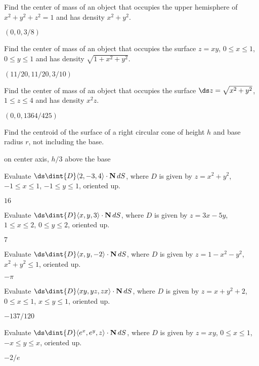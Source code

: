 \begin{exercises}

\exercise Find the center of mass of an object that occupies the upper
hemisphere of $x^2+y^2+z^2=1$ and has density $x^2+y^2$.
\begin{answer} $(0,0,3/8)$
\end{answer}

\exercise Find the center of mass of an object that occupies the
surface $z=xy$, $0\le x\le1$, $0\le y\le 1$ and has density $\sqrt{1+x^2+y^2}$.
\begin{answer} $(11/20,11/20,3/10)$
\end{answer}

\exercise Find the center of mass of an object that occupies the
surface $\ds z=\sqrt{x^2+y^2}$, $1\le z\le4$ and has density $x^2z$.
\begin{answer} $(0,0,1364/425)$
\end{answer}

\exercise Find the centroid of the surface of a right circular cone of
height $h$ and base radius $r$, not including the base.
\begin{answer} on center axis, $h/3$ above the base
\end{answer}

\exercise Evaluate $\ds \dint{D} \langle 2,-3,4\rangle\cdot {\bf
  N}\,dS$, where $D$ is given by $z=x^2+y^2$, $-1\le x\le 1$, $-1\le
y\le 1$, oriented up.
\begin{answer} $16$
\end{answer}

\exercise Evaluate $\ds \dint{D} \langle x,y,3\rangle\cdot {\bf
  N}\,dS$, where $D$ is given by $z=3x-5y$, $1\le x\le 2$, $0\le
y\le 2$, oriented up.
\begin{answer} $7$
\end{answer}

\exercise Evaluate $\ds \dint{D} \langle x,y,-2\rangle\cdot {\bf
  N}\,dS$, where $D$ is given by $z=1-x^2-y^2$, $x^2+y^2\le1$,
oriented up.
\begin{answer} $-\pi$
\end{answer}

\exercise Evaluate $\ds \dint{D} \langle xy, yz,zx\rangle\cdot {\bf
  N}\,dS$, where $D$ is given by $z=x+y^2+2$, $0\le x\le 1$, $x\le
y\le 1$, oriented up.
\begin{answer} $-137/120$
\end{answer}

\exercise Evaluate $\ds \dint{D} \langle e^x, e^y,z\rangle\cdot {\bf
  N}\,dS$, where $D$ is given by $z=xy$, $0\le x\le 1$, $-x\le
y\le x$, oriented up.
\begin{answer} $-2/e$
\end{answer}


\end{exercises}
